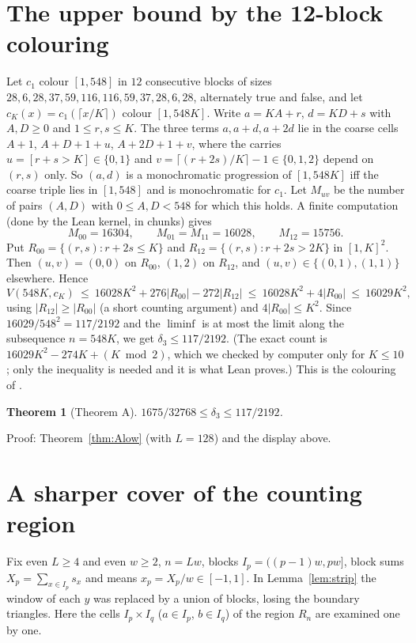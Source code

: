 \documentclass[11pt]{amsart}
\newtheorem{theorem}{Theorem}[section]
\theoremstyle{remark}
\newcommand{\mono}{V}
\begin{document}
\section{The upper bound by the 12-block colouring}\label{sec:upper}
Let $c_1$ colour $[1,548]$ in $12$ consecutive blocks of sizes $28,6,28,37,59,116,116,59,37,28,6,28$, alternately true and false, and let $c_K(x)=c_1(\lceil x/K\rceil)$ colour $[1,548K]$.
Write $a=KA+r$, $d=KD+s$ with $A,D\ge0$ and $1\le r,s\le K$. The three terms $a,a+d,a+2d$ lie in the coarse cells $A+1$, $A+D+1+u$, $A+2D+1+v$, where the carries
$u=[r+s>K]\in\{0,1\}$ and $v=\lceil(r+2s)/K\rceil-1\in\{0,1,2\}$ depend on $(r,s)$ only. So $(a,d)$ is a monochromatic progression of $[1,548K]$ iff the coarse triple lies in $[1,548]$ and is monochromatic for $c_1$.
Let $M_{uv}$ be the number of pairs $(A,D)$ with $0\le A,D<548$ for which this holds. A finite computation (done by the Lean kernel, in chunks) gives
\[M_{00}=16304,\qquad M_{01}=M_{11}=16028,\qquad M_{12}=15756.\]
Put $R_{00}=\{(r,s):r+2s\le K\}$ and $R_{12}=\{(r,s):r+2s>2K\}$ in $[1,K]^2$. Then $(u,v)=(0,0)$ on $R_{00}$, $(1,2)$ on $R_{12}$, and $(u,v)\in\{(0,1),(1,1)\}$ elsewhere. Hence
\[\mono(548K,c_K)\ \le\ 16028K^2+276|R_{00}|-272|R_{12}|\ \le\ 16028K^2+4|R_{00}|\ \le\ 16029K^2,\]
using $|R_{12}|\ge|R_{00}|$ (a short counting argument) and $4|R_{00}|\le K^2$. Since $16029/548^2=117/2192$ and the $\liminf$ is at most the limit along the subsequence $n=548K$, we get $\delta_3\le117/2192$.
(The exact count is $16029K^2-274K+(K\bmod2)$, which we checked by computer only for $K\le10$; only the inequality is needed and it is what Lean proves.) This is the colouring of \cite{PRS08}.

\begin{theorem}[Theorem A]\label{thm:A}
$1675/32768\le\delta_3\le117/2192$.
\end{theorem}
Proof: Theorem~\ref{thm:Alow} (with $L=128$) and the display above.

\section{A sharper cover of the counting region}\label{sec:model2}
Fix even $L\ge4$ and even $w\ge2$, $n=Lw$, blocks $I_p=((p-1)w,pw]$, block sums $X_p=\sum_{x\in I_p}s_x$ and means $x_p=X_p/w\in[-1,1]$.
In Lemma~\ref{lem:strip} the window of each $y$ was replaced by a union of blocks, losing the boundary triangles. Here the cells $I_p\times I_q$ ($a\in I_p$, $b\in I_q$) of the region $R_n$ are examined one by one.
\end{document}
